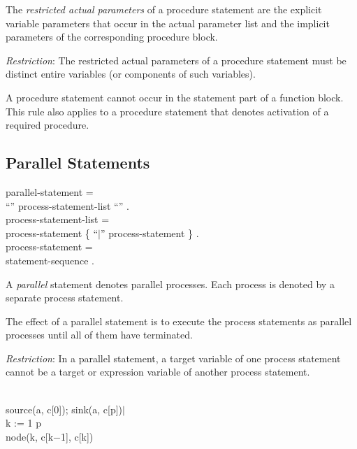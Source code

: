 The {\it restricted actual parameters} of a procedure
statement are the explicit variable parameters that occur in
the actual parameter list and the implicit parameters of the
corresponding procedure block.

\blankline

{\it Restriction}: The restricted actual parameters of a
procedure statement must be distinct entire variables (or
components of such variables).

\blankline

A procedure statement cannot occur in the statement part of
a function block. This rule also applies to a procedure
statement that denotes activation of a required procedure.


\subsection{Parallel Statements}

\begin{grammar}
  {\GA}parallel-statement =                                 \\
    {\GB}``{\Parallel}'' process-statement-list ``{\End}'' .\\
  {\GA}process-statement-list =                             \\
    {\GB}process-statement \{ ``$|$'' process-statement \} .\\
  {\GA}process-statement =                                  \\
    {\GB}statement-sequence .                               \\
\end{grammar}

A {\it parallel} statement denotes parallel processes. Each
process is denoted by a separate process statement.

The effect of a parallel statement is to execute the process
statements as parallel processes until all of them have
terminated.

\blankline

{\it Restriction}: In a parallel statement, a target
variable of one process statement cannot be a target or
expression variable of another process statement.

\blankline

\example

\begin{program}{13.6em}
  {\PA}{\Parallel}                        \\
    {\PB}source(a, c[0]); sink(a, c[p])$|$\\
    {\PB}{\Forall} k := 1 {\To} p {\Do}   \\
      {\PC}node(k, c[k$-$1], c[k])        \\
  {\PA}{\End}
\end{program}


